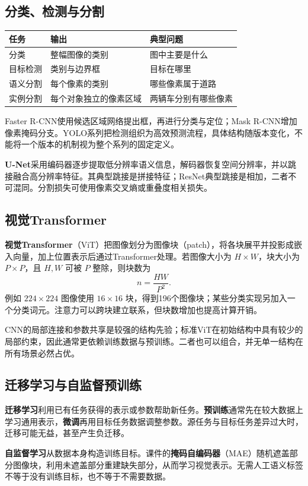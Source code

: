 \documentclass[UTF8,fontset=none,zihao=-4,a4paper]{ctexart}
\newcommand{\term}[1]{\textbf{#1}}
\begin{document}
\subsection{分类、检测与分割}
\begin{center}\begin{tabularx}{\linewidth}{lYY}
\toprule 任务 & 输出 & 典型问题\\\midrule
分类 & 整幅图像的类别 & 图中主要是什么\\
目标检测 & 类别与边界框 & 目标在哪里\\
语义分割 & 每个像素的类别 & 哪些像素属于道路\\
实例分割 & 每个对象独立的像素区域 & 两辆车分别有哪些像素\\\bottomrule
\end{tabularx}\end{center}
Faster R-CNN使用候选区域网络提出框，再进行分类与定位；Mask R-CNN增加像素掩码分支。YOLO系列把检测组织为高效预测流程，具体结构随版本变化，不能将一个版本的机制视为整个系列的固定定义。

\term{U-Net}采用编码器逐步提取低分辨率语义信息，解码器恢复空间分辨率，并以跳接融合高分辨率特征。其典型跳接是拼接特征；ResNet典型跳接是相加，二者不可混同。分割损失可使用像素交叉熵或重叠度相关损失。

\subsection{视觉Transformer}
\term{视觉Transformer}（ViT）把图像划分为图像块（patch），将各块展平并投影成嵌入向量，加上位置表示后通过Transformer处理。若图像大小为 $H\times W$，块大小为 $P\times P$，且 $H,W$ 可被 $P$ 整除，则块数为
\[
n=\frac{H W}{P^2}.
\]
例如 $224\times224$ 图像使用 $16\times16$ 块，得到196个图像块；某些分类实现另加入一个分类词元。注意力可以跨块建立联系，但块数增加也提高计算开销。

CNN的局部连接和参数共享是较强的结构先验；标准ViT在初始结构中具有较少的局部约束，因此通常更依赖训练数据与预训练。二者也可以组合，并无单一结构在所有场景必然占优。

\subsection{迁移学习与自监督预训练}
\term{迁移学习}利用已有任务获得的表示或参数帮助新任务。\term{预训练}通常先在较大数据上学习通用表示，\term{微调}再用目标任务数据调整参数。源任务与目标任务差异过大时，迁移可能无益，甚至产生负迁移。

\term{自监督学习}从数据本身构造训练目标。课件的\term{掩码自编码器}（MAE）随机遮盖部分图像块，利用未遮盖部分重建缺失部分，从而学习视觉表示。无需人工语义标签不等于没有训练目标，也不等于不需要数据。
\end{document}
